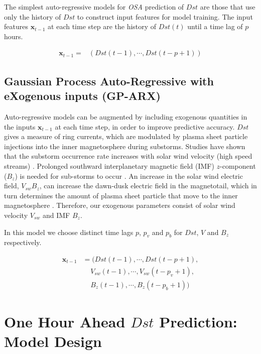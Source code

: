 \documentclass{article}
\begin{document}
The simplest auto-regressive models for \emph{OSA} prediction of $Dst$
are those that use only the history of $Dst$ to construct input
features for model training. The input features $\mathbf{x}_{t-1}$ at
each time step are the history of $Dst(t)$ until a time lag of $p$ hours.

\begin{align*}
  \mathbf{x}_{t-1} = & \left(Dst(t-1), \cdots , Dst(t-p+1)\right)
\end{align*}

\subsection{Gaussian Process Auto-Regressive with eXogenous inputs (GP-ARX)} \label{sec:gparx}

Auto-regressive models can be augmented by including exogenous
quantities in the inputs $\mathbf{x}_{t-1}$ at each time step, in
order to improve predictive accuracy. $Dst$ gives a measure of ring
currents, which are modulated by plasma sheet particle injections into
the inner magnetosphere during substorms. Studies have shown that the
substorm occurrence rate increases with solar wind velocity (high
speed streams) \citet{Kissinger2011,Newell2016}. Prolonged southward
interplanetary magnetic field (IMF) $z$-component ($B_z$) is needed
for sub-storms to occur \citet{McPherron1986}. An increase in the
solar wind electric field, $V_{sw}B_z$, can increase the dawn-dusk
electric field in the magnetotail, which in turn determines the amount
of plasma sheet particle that move to the inner magnetosphere
\citet{Friedel2001}. Therefore, our exogenous parameters consist of
solar wind velocity $V_{sw}$ and IMF $B_z$.   

In this model we choose distinct time lags $p$, $p_{v}$ and $p_{b}$
for $Dst$, $V$ and $B_z$ respectively.

\begin{align*}
  \mathbf{x}_{t-1} & = (Dst(t-1), \cdots , Dst(t-p+1), \\
                   & \ \ \ \ \  V_{sw}(t-1), \cdots, V_{sw}(t-p_{v}+1),\\
                   & \ \ \ \ \  B_{z}(t-1), \cdots, B_{z}(t-p_{b}+1))
\end{align*}

\section{One Hour Ahead $Dst$ Prediction: Model Design}\label{sec:modeldesign}
\end{document}
